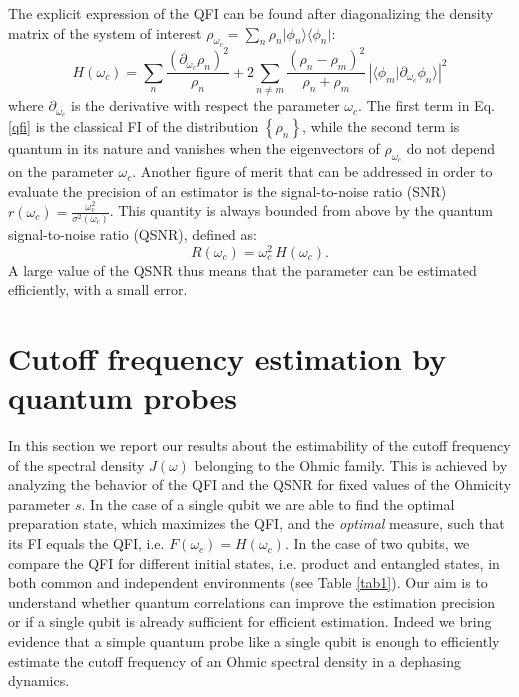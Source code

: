 \documentclass[ pra,a4paper,aps,twocolumn,superscriptaddress]{revtex4-1}
\def\tc#1{{\color{black}#1}}
\begin{document}
The explicit expression of
the QFI can be found after diagonalizing the density matrix of the system of interest $\rho_{\omega_{c}}=\sum_{n}\rho_{n}\vert\phi_{n}\rangle\langle\phi_{n}\vert$:
\begin{equation}
H\!(\omega_{c})\!=\! \sum_n \frac{(\partial_{\omega_c} \rho_n)^2}{\rho_{n}}+
2\sum_{n\ne m}\frac{(\rho_n-\rho_m)^2}{\rho_n+\rho_m}\,\left| \langle\phi_{m}\vert\partial_{\omega_c} \phi_{n}\rangle \right| ^2
\label{qfi}
\end{equation}
where $\partial_{\omega_c}$ is the derivative with respect the parameter $\omega_c$.
 The first term in Eq. \eqref{qfi} is the classical FI of the distribution $\left\{\rho_{n}\right\}$, while the second term is quantum in its nature and
vanishes when the eigenvectors of $\rho_{\omega_{c}}$ do not depend on
the parameter $\omega_{c}$.
Another figure of merit that can be addressed in order to evaluate the precision of an estimator is the signal-to-noise ratio (SNR) $r(\omega_c)=\frac{\omega_c^2}{\sigma^2(\omega_c)}$.  This quantity is always bounded \tc{from above} by the quantum signal-to-noise ratio (QSNR), defined as:
\begin{equation}
R(\omega_c)=\omega_c^2 \, H(\omega_c).
\label{qsnr}
\end{equation}
A large value of the QSNR thus means that the parameter can be estimated efficiently, with a small error.
%
\section{Cutoff frequency estimation by quantum probes}\label{sec:4}
%
In this section we report our results about the estimability of the  cutoff frequency of the spectral density $J(\omega)$ belonging to the Ohmic family.  This is achieved by analyzing the 
behavior of the QFI and the QSNR for fixed values of the Ohmicity parameter $s$. 
In the case of a single qubit we are able to find the optimal preparation state, which maximizes the 
QFI, and the {\it optimal} measure, such that its FI equals the QFI, i.e. $F(\omega_c)=H(\omega_c)$.
 In the case of two qubits, we compare the QFI for different initial states, i.e. product  and entangled states, in both common and independent environments (see Table \ref{tab1}). 
 Our aim is to understand whether quantum correlations can improve the estimation precision or if a  single qubit is already sufficient for efficient estimation.  Indeed we bring evidence that a simple quantum probe like a single qubit is enough to efficiently estimate the cutoff frequency of an Ohmic spectral density in a dephasing dynamics.
%
\end{document}
